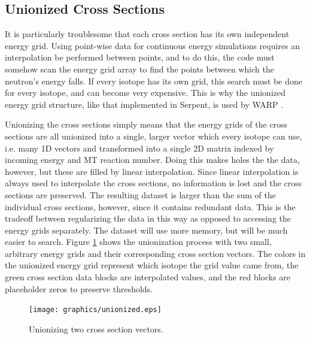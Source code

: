 \subsection{Unionized Cross Sections}

It is particularly troublesome that each cross section has its own independent energy grid.  Using point-wise data for continuous energy simulations requires an interpolation be performed between points, and to do this, the code must somehow scan the energy grid array to find the points between which the neutron's energy falls.  If every isotope has its own grid, this search must be done for every isotope, and can become very expensive.  This is why the unionized energy grid structure, like that implemented in Serpent, is used by WARP \cite{jaakko_xs}.

Unionizing the cross sections simply means that the energy grids of the cross sections are all unionized into a single, larger vector which every isotope can use, i.e. many 1D vectors and transformed into a single 2D matrix indexed by incoming energy and MT reaction number.  Doing this makes holes the the data, however, but these are filled by linear interpolation.  Since linear interpolation is always used to interpolate the cross sections, no information is lost and the cross sections are preserved.  The resulting dataset is larger than the sum of the individual cross sections, however, since it contains redundant data.  This is the tradeoff between regularizing the data in this way as opposed to accessing the energy grids separately.  The dataset will use more memory, but will be much easier to search.  Figure \ref{unionized_layout} shows the unionization process with two small, arbitrary energy grids and their corresponding cross section vectors.  The colors in the unionized energy grid represent which isotope the grid value came from, the green cross section data blocks are interpolated values, and the red blocks are placeholder zeros to preserve thresholds.

\begin{figure}[h!] 
\centering
\texttt{[image: graphics/unionized.eps]}
\caption{Unionizing two cross section vectors. \label{unionized_layout} }
\end{figure}


